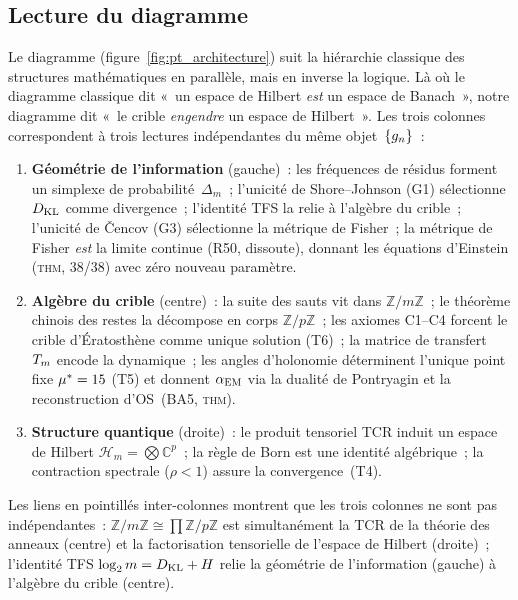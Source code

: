\documentclass[12pt,a4paper]{article}
\begin{document}
\subsection{Lecture du diagramme}
\label{sec:app_h_reading}

Le diagramme (figure~\ref{fig:pt_architecture}) suit la hiérarchie
classique des structures mathématiques en parallèle, mais en
inverse la logique. Là où le diagramme classique dit «~un espace
de Hilbert \emph{est} un espace de Banach~», notre diagramme dit
«~le crible \emph{engendre} un espace de Hilbert~». Les trois
colonnes correspondent à trois lectures indépendantes du même
objet~$\{g_n\}$~:

\begin{enumerate}[nosep]
\item \textbf{Géométrie de l'information} (gauche)~: les fréquences
  de résidus forment un simplexe de probabilité~$\Delta_m$~;
  l'unicité de Shore--Johnson (G1) sélectionne $D_{\mathrm{KL}}$ comme
  divergence~; l'identité TFS la relie à l'algèbre du crible~;
  l'unicité de \v{C}encov (G3) sélectionne la métrique de Fisher~;
  la métrique de Fisher \emph{est} la limite continue (R50,
  dissoute), donnant les équations d'Einstein (\textsc{thm}, 38/38)
  avec zéro nouveau paramètre.

\item \textbf{Algèbre du crible} (centre)~: la suite des sauts vit
  dans $\mathbb{Z}/m\mathbb{Z}$~; le théorème chinois des restes la
  décompose en corps $\mathbb{Z}/p\mathbb{Z}$~; les axiomes
  C1--C4 forcent le crible d'Ératosthène comme unique solution
  (T6)~; la matrice de transfert~$T_m$ encode la dynamique~; les
  angles d'holonomie déterminent l'unique point fixe
  ${\mu^{*}} = 15$ (T5) et donnent $\alpha_{\mathrm{EM}}$ via la dualité de
  Pontryagin et la reconstruction d'OS~(BA5, \textsc{thm}).

\item \textbf{Structure quantique} (droite)~: le produit tensoriel
  TCR induit un espace de Hilbert
  $\mathcal{H}_m = \bigotimes \mathbb{C}^p$~; la règle de Born est
  une identité algébrique~; la contraction spectrale ($\rho < 1$)
  assure la convergence~(T4).
\end{enumerate}

Les liens en pointillés inter-colonnes montrent que les trois
colonnes ne sont pas indépendantes~:
$\mathbb{Z}/m\mathbb{Z} \cong \prod\mathbb{Z}/p\mathbb{Z}$ est
simultanément la TCR de la théorie des anneaux (centre) et la
factorisation tensorielle de l'espace de Hilbert (droite)~;
l'identité TFS $\log_2 m = D_{\mathrm{KL}} + H$ relie la géométrie de
l'information (gauche) à l'algèbre du crible (centre).
\end{document}
